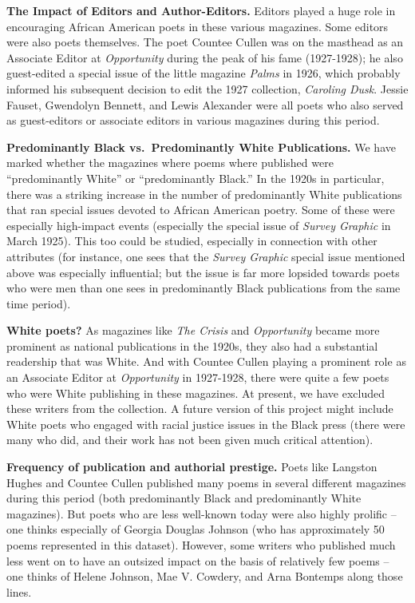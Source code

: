 \documentclass[
  letterpaper,
  DIV=11,
  numbers=noendperiod]{scrartcl}
\begin{document}
\textbf{The Impact of Editors and Author-Editors.} Editors played a huge
role in encouraging African American poets in these various magazines.
Some editors were also poets themselves. The poet Countee Cullen was on
the masthead as an Associate Editor at \emph{Opportunity} during the
peak of his fame (1927-1928); he also guest-edited a special issue of
the little magazine \emph{Palms} in 1926, which probably informed his
subsequent decision to edit the 1927 collection, \emph{Caroling Dusk}.
Jessie Fauset, Gwendolyn Bennett, and Lewis Alexander were all poets who
also served as guest-editors or associate editors in various magazines
during this period.

\textbf{Predominantly Black vs.~Predominantly White Publications. }We
have marked whether the magazines where poems where published were
``predominantly White'' or ``predominantly Black.'' In the 1920s in
particular, there was a striking increase in the number of predominantly
White publications that ran special issues devoted to African American
poetry. Some of these were especially high-impact events (especially the
special issue of \emph{Survey Graphic} in March 1925). This too could be
studied, especially in connection with other attributes (for instance,
one sees that the \emph{Survey Graphic} special issue mentioned above
was especially influential; but the issue is far more lopsided towards
poets who were men than one sees in predominantly Black publications
from the same time period).

\textbf{White poets? }As magazines like \emph{The Crisis} and
\emph{Opportunity} became more prominent as national publications in the
1920s, they also had a substantial readership that was White. And with
Countee Cullen playing a prominent role as an Associate Editor at
\emph{Opportunity} in 1927-1928, there were quite a few poets who were
White publishing in these magazines. At present, we have excluded these
writers from the collection. A future version of this project might
include White poets who engaged with racial justice issues in the Black
press (there were many who did, and their work has not been given much
critical attention).

\textbf{Frequency of publication and authorial prestige. }Poets like
Langston Hughes and Countee Cullen published many poems in several
different magazines during this period (both predominantly Black and
predominantly White magazines). But poets who are less well-known today
were also highly prolific -- one thinks especially of Georgia Douglas
Johnson (who has approximately 50 poems represented in this dataset).
However, some writers who published much less went on to have an
outsized impact on the basis of relatively few poems -- one thinks of
Helene Johnson, Mae V. Cowdery, and Arna Bontemps along those lines.
\end{document}
